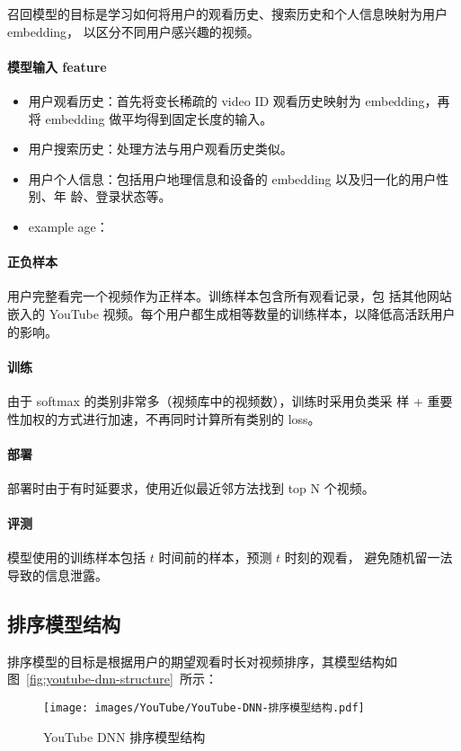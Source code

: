 召回模型的目标是学习如何将用户的观看历史、搜索历史和个人信息映射为用户 embedding，
以区分不同用户感兴趣的视频。

\paragraph{模型输入 feature}
\begin{itemize}
  \item 用户观看历史：首先将变长稀疏的 video ID 观看历史映射为 embedding，再将
    embedding 做平均得到固定长度的输入。
  \item 用户搜索历史：处理方法与用户观看历史类似。
  \item 用户个人信息：包括用户地理信息和设备的 embedding 以及归一化的用户性别、年
    龄、登录状态等。
  \item example age：\color{red}{待补充}
\end{itemize}
\paragraph{正负样本} 用户完整看完一个视频作为正样本。训练样本包含所有观看记录，包
括其他网站嵌入的 YouTube 视频。每个用户都生成相等数量的训练样本，以降低高活跃用户
的影响。
\paragraph{训练} 由于 softmax 的类别非常多（视频库中的视频数），训练时采用负类采
样 + 重要性加权的方式进行加速，不再同时计算所有类别的 loss。
\paragraph{部署} 部署时由于有时延要求，使用近似最近邻方法找到 top N 个视频。
\paragraph{评测} 模型使用的训练样本包括 $t$ 时间前的样本，预测 $t$ 时刻的观看，
避免随机留一法导致的信息泄露。

\subsection{排序模型结构}
排序模型的目标是根据用户的期望观看时长对视频排序，其模型结构如图~\ref{fig:youtube-dnn-structure}~所示：

\begin{figure}[ht]
  \centering
  \texttt{[image: images/YouTube/YouTube-DNN-排序模型结构.pdf]}
  \caption{YouTube DNN 排序模型结构}
  \label{fig:youtube-dnn-ranking-structure}
\end{figure}

